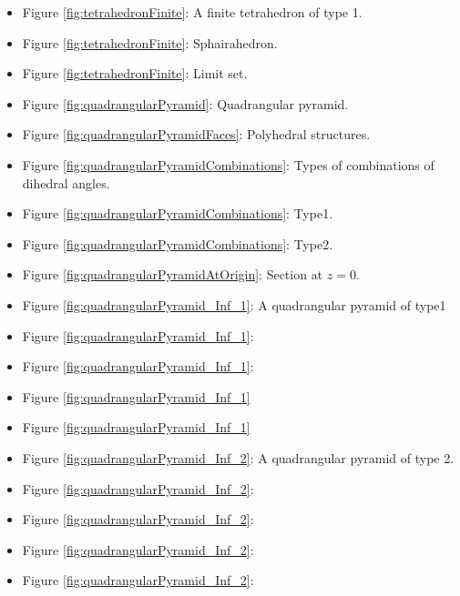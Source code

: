 \documentclass[suppldata, dvipdfmx]{interact}
\theoremstyle{plain}%
\theoremstyle{definition}
\theoremstyle{remark}
\theoremstyle{problemstyle}
\begin{document}
\begin{itemize}
\item Figure \ref{fig:tetrahedronFinite}: A finite tetrahedron of type
      1.
\item Figure
      \ref{fig:tetrahedronFinite}:
      Sphairahedron.
\item Figure
      \ref{fig:tetrahedronFinite}:
      Limit set. 

\item Figure \ref{fig:quadrangularPyramid}: Quadrangular pyramid.
\item Figure \ref{fig:quadrangularPyramidFaces}: Polyhedral structures.

\item Figure \ref{fig:quadrangularPyramidCombinations}: Types of
      combinations of dihedral angles.
\item Figure
      \ref{fig:quadrangularPyramidCombinations}:
      Type1.
\item Figure
      \ref{fig:quadrangularPyramidCombinations}:
      Type2.
\item Figure \ref{fig:quadrangularPyramidAtOrigin}: Section at $z=0$.
\item Figure \ref{fig:quadrangularPyramid_Inf_1}: A quadrangular pyramid
      of type1
\item Figure
      \ref{fig:quadrangularPyramid_Inf_1}:
\item Figure
      \ref{fig:quadrangularPyramid_Inf_1}:
\item Figure \ref{fig:quadrangularPyramid_Inf_1}
\item Figure
      \ref{fig:quadrangularPyramid_Inf_1}

\item Figure \ref{fig:quadrangularPyramid_Inf_2}: A quadrangular pyramid
      of type 2.
\item Figure
      \ref{fig:quadrangularPyramid_Inf_2}: 
\item Figure
      \ref{fig:quadrangularPyramid_Inf_2}: 
\item Figure \ref{fig:quadrangularPyramid_Inf_2}:
\item Figure
      \ref{fig:quadrangularPyramid_Inf_2}: 


\end{itemize}
\end{document}
